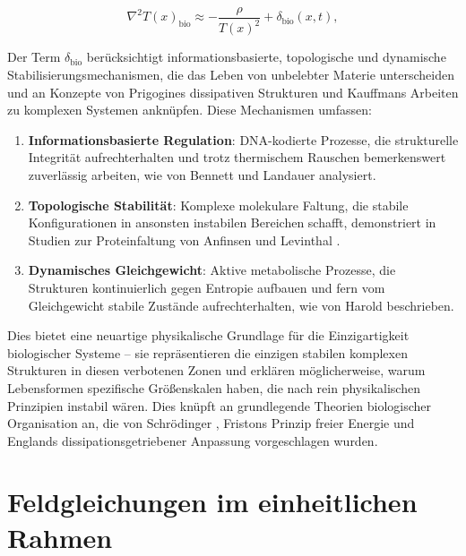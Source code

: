 \documentclass[twocolumn,aps,prl]{revtex4-2}
\begin{document}
	\begin{equation}
		\nabla^2 T(x)_{\text{bio}} \approx -\frac{\rho}{T(x)^2} + \delta_{\text{bio}}(x,t), \label{eq:bio_field_eq}
	\end{equation}
	
	Der Term $\delta_{\text{bio}}$ berücksichtigt informationsbasierte, topologische und dynamische Stabilisierungsmechanismen, die das Leben von unbelebter Materie unterscheiden und an Konzepte von Prigogines dissipativen Strukturen \cite{Prigogine1980} und Kauffmans Arbeiten zu komplexen Systemen \cite{Kauffman1993} anknüpfen. Diese Mechanismen umfassen:
	
	\begin{enumerate}
		\item \textbf{Informationsbasierte Regulation}: DNA-kodierte Prozesse, die strukturelle Integrität aufrechterhalten und trotz thermischem Rauschen bemerkenswert zuverlässig arbeiten, wie von Bennett \cite{Bennett1982} und Landauer \cite{Landauer1961} analysiert.
		\item \textbf{Topologische Stabilität}: Komplexe molekulare Faltung, die stabile Konfigurationen in ansonsten instabilen Bereichen schafft, demonstriert in Studien zur Proteinfaltung von Anfinsen \cite{Anfinsen1973} und Levinthal \cite{Levinthal1968}.
		\item \textbf{Dynamisches Gleichgewicht}: Aktive metabolische Prozesse, die Strukturen kontinuierlich gegen Entropie aufbauen und fern vom Gleichgewicht stabile Zustände aufrechterhalten, wie von Harold \cite{Harold2001} beschrieben.
	\end{enumerate}
	
	Dies bietet eine neuartige physikalische Grundlage für die Einzigartigkeit biologischer Systeme – sie repräsentieren die einzigen stabilen komplexen Strukturen in diesen verbotenen Zonen und erklären möglicherweise, warum Lebensformen spezifische Größenskalen haben, die nach rein physikalischen Prinzipien instabil wären. Dies knüpft an grundlegende Theorien biologischer Organisation an, die von Schrödinger \cite{Schrodinger1944}, Fristons Prinzip freier Energie \cite{Friston2010} und Englands dissipationsgetriebener Anpassung \cite{England2013} vorgeschlagen wurden.
	
	\section{Feldgleichungen im einheitlichen Rahmen}
	\label{sec:field_equations}
	
\end{document}
